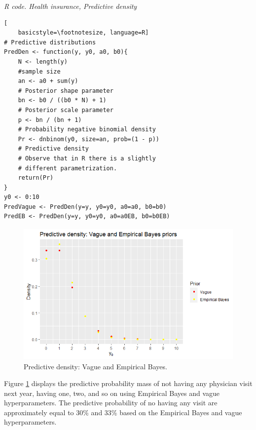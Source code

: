 \clearpage
\begin{tcolorbox}[enhanced,width=4.67in,center upper,
	fontupper=\large\bfseries,drop shadow southwest,sharp corners]
\textit{R code. Health insurance, Predictive density}
\begin{VF}
\begin{lstlisting}[
	basicstyle=\footnotesize, language=R]
# Predictive distributions
PredDen <- function(y, y0, a0, b0){
	N <- length(y)
	#sample size
	an <- a0 + sum(y) 
	# Posterior shape parameter
	bn <- b0 / ((b0 * N) + 1) 
	# Posterior scale parameter
	p <- bn / (bn + 1) 
	# Probability negative binomial density
	Pr <- dnbinom(y0, size=an, prob=(1 - p))
	# Predictive density
	# Observe that in R there is a slightly 
	# different parametrization.
	return(Pr)
}
y0 <- 0:10
PredVague <- PredDen(y=y, y0=y0, a0=a0, b0=b0)
PredEB <- PredDen(y=y, y0=y0, a0=a0EB, b0=b0EB)
\end{lstlisting}
\end{VF}
\end{tcolorbox}

\begin{figure}[!h]
	\includegraphics[width=340pt, height=200pt]{Chapters/chapter1/figures/Predictive.png}
	\caption[List of figure caption goes here]{Predictive density: Vague and Empirical Bayes.}\label{fig14}
\end{figure}

Figure \ref{fig14} displays the predictive probability mass of not having any physician visit next year, having one, two, and so on using Empirical Bayes and vague hyperparameters. The predictive probability of no having any visit are approximately equal to 30\% and 33\% based on the Empirical Bayes and vague hyperparameters. 

